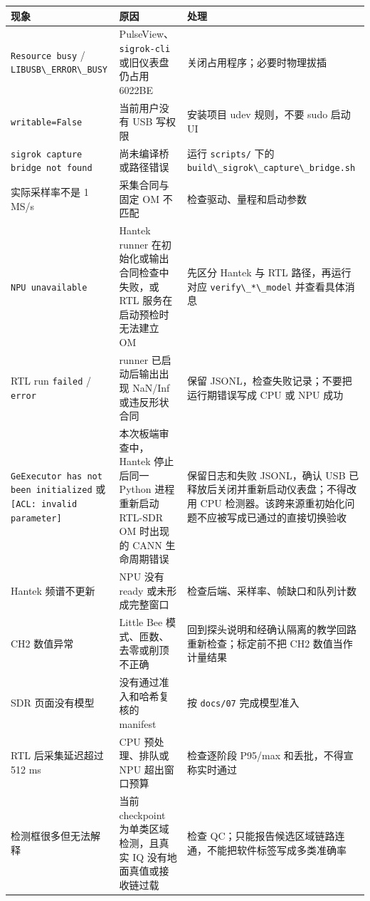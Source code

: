 \begin{longtable}[]{@{}
  >{\raggedright\arraybackslash}p{}
  >{\raggedright\arraybackslash}p{}
  >{\raggedright\arraybackslash}p{}@{}}
\toprule\noalign{}
\begin{minipage}[b]{\linewidth}\raggedright
现象
\end{minipage} & \begin{minipage}[b]{\linewidth}\raggedright
原因
\end{minipage} & \begin{minipage}[b]{\linewidth}\raggedright
处理
\end{minipage} \\
\midrule\noalign{}
\endhead
\bottomrule\noalign{}
\endlastfoot
\passthrough{\lstinline!Resource busy!} /
\passthrough{\lstinline!LIBUSB\_ERROR\_BUSY!} &
PulseView、\passthrough{\lstinline!sigrok-cli!} 或旧仪表盘仍占用 6022BE
& 关闭占用程序；必要时物理拔插 \\
\passthrough{\lstinline!writable=False!} & 当前用户没有 USB 写权限 &
安装项目 udev 规则，不要 sudo 启动 UI \\
\passthrough{\lstinline!sigrok capture bridge not found!} &
尚未编译桥或路径错误 & 运行 \passthrough{\lstinline!scripts/!} 下的
\passthrough{\lstinline!build\_sigrok\_capture\_bridge.sh!} \\
实际采样率不是 1 MS/s & 采集合同与固定 OM 不匹配 &
检查驱动、量程和启动参数 \\
\passthrough{\lstinline!NPU unavailable!} & Hantek runner
在初始化或输出合同检查中失败，或 RTL 服务在启动预检时无法建立 OM &
先区分 Hantek 与 RTL 路径，再运行对应
\passthrough{\lstinline!verify\_*\_model!} 并查看具体消息 \\
RTL run \passthrough{\lstinline!failed!} /
\passthrough{\lstinline!error!} & runner 已启动后输出出现 NaN/Inf
或违反形状合同 & 保留 JSONL，检查失败记录；不要把运行期错误写成 CPU 或
NPU 成功 \\
\passthrough{\lstinline!GeExecutor has not been initialized!} 或
\passthrough{\lstinline![ACL: invalid parameter]!} &
本次板端审查中，Hantek 停止后同一 Python 进程重新启动 RTL-SDR OM
时出现的 CANN 生命周期错误 & 保留日志和失败 JSONL，确认 USB
已释放后关闭并重新启动仪表盘；不得改用 CPU
检测器。该跨来源重初始化问题不应被写成已通过的直接切换验收 \\
Hantek 频谱不更新 & NPU 没有 ready 或未形成完整窗口 &
检查后端、采样率、帧缺口和队列计数 \\
CH2 数值异常 & Little Bee 模式、匝数、去零或削顶不正确 &
回到探头说明和经确认隔离的教学回路重新检查；标定前不把 CH2
数值当作计量结果 \\
SDR 页面没有模型 & 没有通过准入和哈希复核的 manifest & 按
\passthrough{\lstinline!docs/07!} 完成模型准入 \\
RTL 后采集延迟超过 512 ms & CPU 预处理、排队或 NPU 超出窗口预算 &
检查逐阶段 P95/max 和丢批，不得宣称实时通过 \\
检测框很多但无法解释 & 当前 checkpoint 为单类区域检测，且真实 IQ
没有地面真值或接收链过载 & 检查
QC；只能报告候选区域链路连通，不能把软件标签写成多类准确率 \\
\end{longtable}

